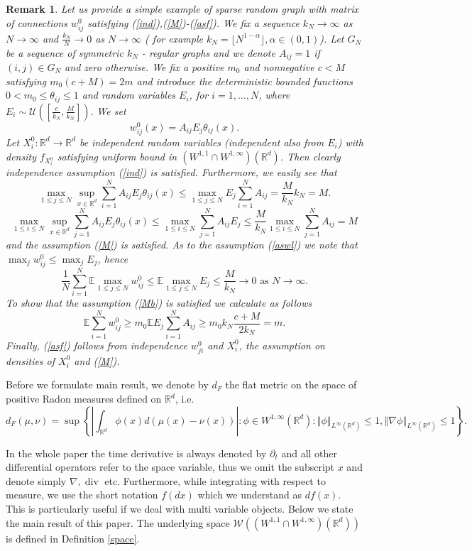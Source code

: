 \documentclass[10pt]{article}
\newtheorem{remark}{Remark}
\def\divv{\operatorname {div}}
\newcommand{\m}[1]{\mbox{#1}}
\newcommand*{\norm}[1]{\left\Vert{#1}\right\Vert}
\newcommand*{\abs}[1]{\left\vert{#1}\right\vert}
\newcommand{\R}{\mathbb{R}}
\newcommand{\ird}{\int_{\mathbb{R}^d}}
\newcommand{\E}{\mathbb{E}}
\newcommand{\W}{\mathcal{W}}
\begin{document}
\begin{remark}
Let us provide a simple example of sparse random graph with matrix of connections $w_{ij}^0$ satisfying (\ref{ind}),(\ref{M})-(\ref{asf}). We fix a sequence  $k_N \rightarrow \infty$ as $N\rightarrow \infty$ and $\frac{k_N}{N} \rightarrow 0$ as $N\rightarrow \infty$ ( for example $k_N=\lfloor N^{1-\alpha}\rfloor, \alpha \in (0,1)$). 
Let $G_N$ be a sequence of symmetric $k_N$ - regular graphs and we denote $A_{ij}=1$ if $(i,j) \in G_N$ and zero otherwise. We fix a positive $m_0$ and nonnegative $c<
M$ satisfying $m_0(c+M) = 2m$ and   introduce the deterministic bounded functions $0<m_0\leq \theta_{ij}\leq 1$ and  random variables $E_i$, for $i=1,\dots,N$, where $E_i \sim \mathcal{U}([\frac{c}{k_N},\frac{M}{k_N}]).$ We set
\[
w_{ij}^0(x) = A_{ij}E_j \theta_{ij}(x).
\]
 Let $X_i^0 : \R^d \to \R^d$ be independent random variables (independent also from $E_i$) with density $f_{X^0_i}$ satisfying uniform bound in $(W^{1,1}\cap W^{1,\infty})(\R^d)$. Then clearly independence assumption (\ref{ind}) is satisfied. Furthermore, we easily see that
 \[
 \max_{1\leq j\leq N} \sup_{x \in \R^d} \sum_{i=1}^N A_{ij}E_j \theta_{ij}(x) \leq   \max_{1\leq j\leq N}  E_j\sum_{i=1}^N A_{ij} =\frac{M}{k_N} k_N= M.
 \]
 \[
 \max_{1\leq i\leq N} \sup_{x \in \R^d} \sum_{j=1}^N A_{ij}E_j \theta_{ij}(x) \leq   \max_{1\leq i\leq N}  \sum_{j=1}^N A_{ij}E_j \leq \frac{M}{k_N} \max_{1\leq i\leq N}  \sum_{j=1}^N A_{ij} = M
 \]
 and the assumption (\ref{M}) is satisfied. As to the assumption (\ref{aswl}) we note that $\max_j w_{ij}^0 \leq \max_{j}E_j$, hence
\[
\frac{1}{N}\sum_{i=1}^N \E \max_{1\leq j\leq N} w_{ij}^0 \leq \E \max_{1\leq j\leq N}E_j \leq \frac{M}{k_N}\rightarrow 0 \m{ as } N\rightarrow \infty.
\]
To show that the assumption (\ref{Mb}) is satisfied we calculate as follows
\[
\E \sum_{i=1}^N w_{ij}^0 \geq m_0 \E E_j \sum_{i=1}^NA_{ij}\geq m_0 k_N\frac{c+M}{2k_N} = m.
\]
Finally, (\ref{asf}) follows from independence $w_{ji}^0$ and $X^0_i$, the assumption on densities of $X^0_i$ and (\ref{M}).
\end{remark}

Before we formulate main result, we denote by $d_F$ the flat metric on the space of positive Radon measures defined on $\R^d$, i.e.
\[
d_F(\mu,\nu) = \sup \left\{\abs{\ird \phi(x)d(\mu(x)-\nu(x))}: \phi \in W^{1,\infty}(\R^d): \norm{\phi}_{L^{\infty}(\R^d)} \leq 1, \norm{\nabla\phi}_{L^{\infty}(\R^d)}\leq 1\right\}.
\]

In the whole paper the time derivative is always denoted by $\partial_t$ and all other differential operators refer to the space variable, thus we omit the subscript $x$ and denote simply $\nabla,\divv$ etc. Furthermore, while integrating with respect to measure, we use the short notation   $f(dx)$ which we understand as $df(x)$. This is particularly useful if we deal with multi variable objects.
Below we state the main result of this paper. The underlying space $\W((W^{1,1}\cap W^{1,\infty})(\R^d))$ is defined in Definition \ref{space}.
\end{document}
